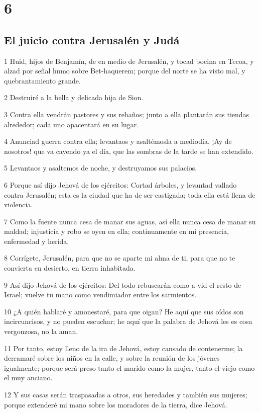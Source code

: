 \chapter{6}

\section*{El juicio contra Jerusalén y Judá}

\par 1 Huid, hijos de Benjamín, de en medio de Jerusalén, y tocad bocina en Tecoa, y alzad por señal humo sobre Bet-haquerem; porque del norte se ha visto mal, y quebrantamiento grande.
\par 2 Destruiré a la bella y delicada hija de Sion.
\par 3 Contra ella vendrán pastores y sus rebaños; junto a ella plantarán sus tiendas alrededor; cada uno apacentará en su lugar.
\par 4 Anunciad guerra contra ella; levantaos y asaltémosla a mediodía. ¡Ay de nosotros! que va cayendo ya el día, que las sombras de la tarde se han extendido.
\par 5 Levantaos y asaltemos de noche, y destruyamos sus palacios.
\par 6 Porque así dijo Jehová de los ejércitos: Cortad árboles, y levantad vallado contra Jerusalén; esta es la ciudad que ha de ser castigada; toda ella está llena de violencia.
\par 7 Como la fuente nunca cesa de manar sus aguas, así ella nunca cesa de manar su maldad; injusticia y robo se oyen en ella; continuamente en mi presencia, enfermedad y herida.
\par 8 Corrígete, Jerusalén, para que no se aparte mi alma de ti, para que no te convierta en desierto, en tierra inhabitada.
\par 9 Así dijo Jehová de los ejércitos: Del todo rebuscarán como a vid el resto de Israel; vuelve tu mano como vendimiador entre los sarmientos.
\par 10 ¿A quién hablaré y amonestaré, para que oigan? He aquí que sus oídos son incircuncisos, y no pueden escuchar; he aquí que la palabra de Jehová les es cosa vergonzosa, no la aman.
\par 11 Por tanto, estoy lleno de la ira de Jehová, estoy cansado de contenerme; la derramaré sobre los niños en la calle, y sobre la reunión de los jóvenes igualmente; porque será preso tanto el marido como la mujer, tanto el viejo como el muy anciano.
\par 12 Y sus casas serán traspasadas a otros, sus heredades y también sus mujeres; porque extenderé mi mano sobre los moradores de la tierra, dice Jehová.
